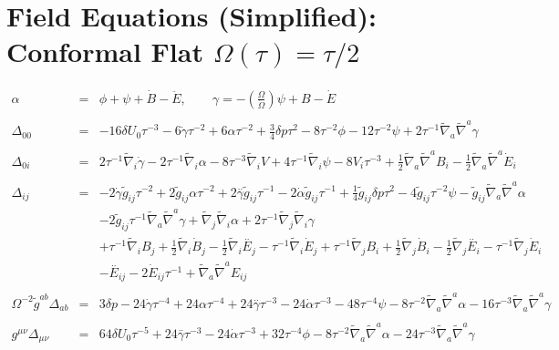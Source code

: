 \documentclass[10pt,letterpaper]{article}
\numberwithin{equation}{section}
\begin{document}
\section{Field Equations (Simplified): Conformal Flat $\Omega(\tau)=\tau/2$}
%
\begin{eqnarray}
\alpha &=& \phi+\psi+\dot B -\ddot E,\qquad \gamma = -\left(\frac{\Omega}{\dot\Omega}\right) \psi + B-\dot E
\\ \nonumber\\
\Delta_{00} &=&-16 \delta U_{0}{} \tau^{-3} - 6 \dot{\gamma} \tau^{-2} + 6 \alpha \tau^{-2} + \tfrac{3}{4} \delta p \tau^2 - 8 \tau^{-2} \phi - 12 \tau^{-2} \psi + 2 \tau^{-1} \tilde{\nabla}_{a}\tilde{\nabla}^{a}\gamma 
\\ \nonumber\\
\Delta_{0i} &=& 2 \tau^{-1} \tilde{\nabla}_{i}\dot{\gamma} - 2 \tau^{-1} \tilde{\nabla}_{i}\alpha - 8 \tau^{-3} \tilde{\nabla}_{i}V + 4 \tau^{-1} \tilde{\nabla}_{i}\psi 
-8 V_{i} \tau^{-3} + \tfrac{1}{2} \tilde{\nabla}_{a}\tilde{\nabla}^{a}B_{i} -  \tfrac{1}{2} \tilde{\nabla}_{a}\tilde{\nabla}^{a}\dot{E}_{i}
\\ \nonumber\\
\Delta_{ij} &=& 
-2 \dot{\gamma} \tilde{g}_{ij} \tau^{-2}
+ 2 \tilde{g}_{ij} \alpha \tau^{-2}
+ 2 \overset{..}{\gamma} \tilde{g}_{ij} \tau^{-1}
- 2 \dot{\alpha} \tilde{g}_{ij} \tau^{-1}
+ \tfrac{1}{4} \tilde{g}_{ij} \delta p \tau^2
- 4 \tilde{g}_{ij} \tau^{-2} \psi
-  \tilde{g}_{ij} \tilde{\nabla}_{a}\tilde{\nabla}^{a}\alpha\nonumber\\
&& - 2 \tilde{g}_{ij} \tau^{-1} \tilde{\nabla}_{a}\tilde{\nabla}^{a}\gamma
+ \tilde{\nabla}_{j}\tilde{\nabla}_{i}\alpha
+ 2 \tau^{-1} \tilde{\nabla}_{j}\tilde{\nabla}_{i}\gamma
\nonumber\\
&& +\tau^{-1} \tilde{\nabla}_{i}B_{j}
+ \tfrac{1}{2} \tilde{\nabla}_{i}\dot{B}_{j}
-  \tfrac{1}{2} \tilde{\nabla}_{i}\overset{..}{E}_{j}
-  \tau^{-1} \tilde{\nabla}_{i}\dot{E}_{j}
+ \tau^{-1} \tilde{\nabla}_{j}B_{i}
+ \tfrac{1}{2} \tilde{\nabla}_{j}\dot{B}_{i}
-  \tfrac{1}{2} \tilde{\nabla}_{j}\overset{..}{E}_{i}
-  \tau^{-1} \tilde{\nabla}_{j}\dot{E}_{i}
\nonumber\\
&&- \overset{..}{E}_{ij}
- 2 \dot{E}_{ij} \tau^{-1}
+ \tilde{\nabla}_{a}\tilde{\nabla}^{a}E_{ij}
\\ \nonumber\\
\Omega^{-2}\tilde g^{ab}\Delta_{ab} &=& 
3 \delta p - 24 \dot{\gamma} \tau^{-4} + 24 \alpha \tau^{-4} + 24 \overset{..}{\gamma} \tau^{-3} - 24 \dot{\alpha} \tau^{-3} - 48 \tau^{-4} \psi - 8 \tau^{-2} \tilde{\nabla}_{a}\tilde{\nabla}^{a}\alpha - 16 \tau^{-3} \tilde{\nabla}_{a}\tilde{\nabla}^{a}\gamma 
\\ \nonumber\\
g^{\mu\nu}\Delta_{\mu\nu} &=& 
64 \delta U_{0}{} \tau^{-5} + 24 \overset{..}{\gamma} \tau^{-3} - 24 \dot{\alpha} \tau^{-3} + 32 \tau^{-4} \phi - 8 \tau^{-2} \tilde{\nabla}_{a}\tilde{\nabla}^{a}\alpha - 24 \tau^{-3} \tilde{\nabla}_{a}\tilde{\nabla}^{a}\gamma 
\end{eqnarray}
\end{document}
